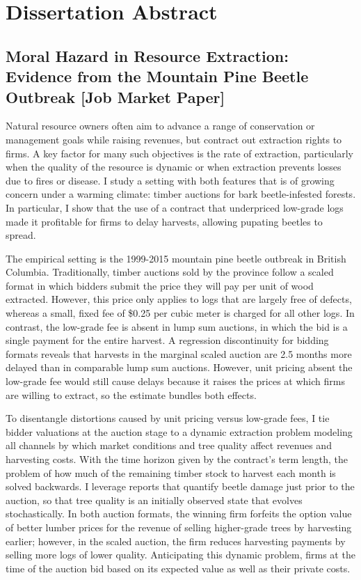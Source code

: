 \documentclass[11pt,letterpaper]{article}
\begin{document}
\newpage

\section*{Dissertation Abstract}

\subsection*{Moral Hazard in Resource Extraction: Evidence from the Mountain Pine Beetle Outbreak [Job Market Paper]}

Natural resource owners often aim to advance a range of conservation or management goals while raising revenues, but contract out extraction rights to firms. A key factor for many such objectives is the rate of extraction, particularly when the quality of the resource is dynamic or when extraction prevents losses due to fires or disease. I study a setting with both features that is of growing concern under a warming climate: timber auctions for bark beetle-infested forests. In particular, I show that the use of a contract that underpriced low-grade logs made it profitable for firms to delay harvests, allowing pupating beetles to spread.

The empirical setting is the 1999-2015 mountain pine beetle outbreak in British Columbia. Traditionally, timber auctions sold by the province follow a scaled format in which bidders submit the price they will pay per unit of wood extracted. However, this price only applies to logs that are largely free of defects, whereas a small, fixed fee of \$0.25 per cubic meter is charged for all other logs. In contrast, the low-grade fee is absent in lump sum auctions, in which the bid is a single payment for the entire harvest. A regression discontinuity for bidding formats reveals that harvests in the marginal scaled auction are 2.5 months more delayed than in comparable lump sum auctions. However, unit pricing absent the low-grade fee would still cause delays because it raises the prices at which firms are willing to extract, so the estimate bundles both effects.

To disentangle distortions caused by unit pricing versus low-grade fees, I tie bidder valuations at the auction stage to a dynamic extraction problem modeling all channels by which market conditions and tree quality affect revenues and harvesting costs. With the time horizon given by the contract's term length, the problem of how much of the remaining timber stock to harvest each month is solved backwards. I leverage reports that quantify beetle damage just prior to the auction, so that tree quality is an initially observed state that evolves stochastically. In both auction formats, the winning firm forfeits the option value of better lumber prices for the revenue of selling higher-grade trees by harvesting earlier; however, in the scaled auction, the firm reduces harvesting payments by selling more logs of lower quality. Anticipating this dynamic problem, firms at the time of the auction bid based on its expected value as well as their private costs.
\end{document}
